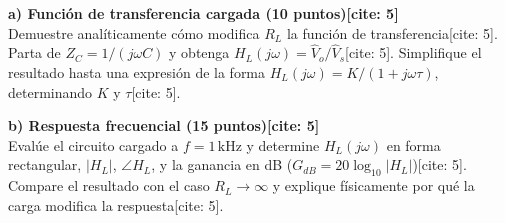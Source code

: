 \documentclass[11pt, a4paper]{article}
\begin{document}
\textbf{a) Función de transferencia cargada (10 puntos)[cite: 5]} \\
Demuestre analíticamente cómo modifica $R_L$ la función de transferencia[cite: 5]. Parta de $Z_C = 1/(j\omega C)$ y obtenga $H_L(j\omega) = \hat V_o / \hat V_s$[cite: 5]. Simplifique el resultado hasta una expresión de la forma $H_L(j\omega) = K / (1+j\omega\tau)$, determinando $K$ y $\tau$[cite: 5].

\vspace{0.3cm}
\textbf{b) Respuesta frecuencial (15 puntos)[cite: 5]} \\
Evalúe el circuito cargado a $f = 1\,\text{kHz}$ y determine $H_L(j\omega)$ en forma rectangular, $|H_L|$, $\angle H_L$, y la ganancia en dB ($G_{dB} = 20\log_{10}|H_L|$)[cite: 5]. Compare el resultado con el caso $R_L \rightarrow \infty$ y explique físicamente por qué la carga modifica la respuesta[cite: 5].
\end{document}
